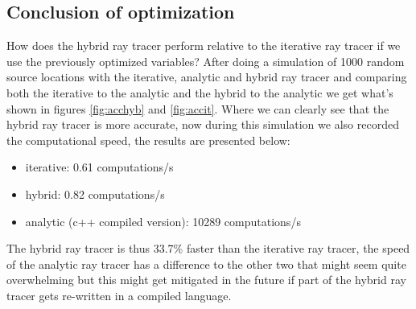\documentclass[11pt,a4paper,faculty=we,language=en,doctype=report]{cls/ugent-doc}
\begin{document}
\subsection{Conclusion of optimization}
How does the hybrid ray tracer perform relative to the iterative ray tracer if we use 
the previously optimized variables? After doing a simulation of 1000 random source locations with
the iterative, analytic and hybrid ray tracer and comparing both the iterative to the analytic and the hybrid to the analytic
we get what's shown in figures \ref{fig:acchyb} and \ref{fig:accit}. Where we can clearly see that the hybrid
ray tracer is more accurate, now during this simulation we also recorded the computational speed, the results
are presented below:
\begin{itemize}
	\item iterative: 0.61 computations/s
	\item hybrid: 0.82 computations/s
	\item analytic (c++ compiled version): 10289 computations/s
\end{itemize}
The hybrid ray tracer is thus 33.7\% faster than the iterative ray tracer, the speed of the analytic ray tracer
has a difference to the other two that might seem quite overwhelming but this might get mitigated in the future if 
part of the hybrid ray tracer gets re-written in a compiled language.
\end{document}
